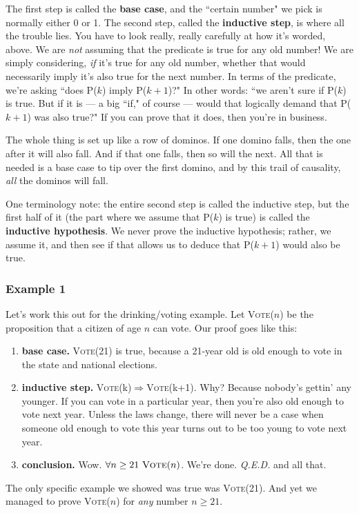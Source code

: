 The first step is called the \textbf{base case}, and the ``certain number"
we pick is normally either 0 or 1. The second step, called the
\textbf{inductive step}, is where all the trouble lies. You have to look
really, really carefully at how it's worded, above. We are \textit{not}
assuming that the predicate is true for any old number! We are simply
considering, \textit{if} it's true for any old number, whether that would
necessarily imply it's also true for the next number. In terms of the
predicate, we're asking ``does P($k$) imply P($k+1$)?" In other words: ``we
aren't sure if P($k$) is true. But if it is --- a big ``if," of course
--- would that logically demand that P($k+1$) was also true?" If you can
prove that it does, then you're in business.

The whole thing is set up like a row of dominos. If one domino falls, then
the one after it will also fall. And if that one falls, then so will the
next. All that is needed is a base case to tip over the first domino, and
by this trail of causality, \textit{all} the dominos will fall.

One terminology note: the entire second step is called the inductive step,
but the first half of it (the part where we assume that P($k$) is true) is
called the \textbf{inductive hypothesis}. We never prove the inductive
hypothesis; rather, we assume it, and then see if that allows us to deduce
that P($k+1$) would also be true.


\subsubsection{Example 1}

Let's work this out for the drinking/voting example. Let \textsc{Vote}($n$)
be the proposition that a citizen of age $n$ can vote. Our proof goes like
this:
\begin{enumerate} 

\item \textbf{base case.} \textsc{Vote}(21) is true, because a 21-year old
is old enough to vote in the state and national elections.

\item \textbf{inductive step.}
\textsc{Vote}(k)$\Rightarrow$\textsc{Vote}(k+1). Why? Because nobody's
gettin' any younger. If you can vote in a particular year, then you're also
old enough to vote next year. Unless the laws change, there will never be a
case when someone old enough to vote this year turns out to be too young to
vote next year.

\item \textbf{conclusion.} Wow. $\forall n\geq21\ \textsc{Vote}(n)$. We're done. \textit{Q.E.D.} and all that.
\end{enumerate}
The only specific example we showed was true was \textsc{Vote}(21). And yet
we managed to prove \textsc{Vote}($n$) for \textit{any} number $n\geq21$.


